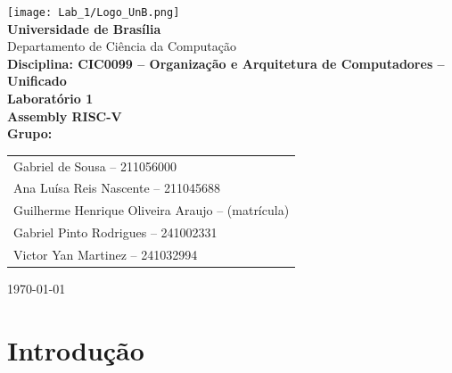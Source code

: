 \documentclass[12pt,a4paper]{article}
\begin{document}
\begin{titlepage}
    \begin{center}
        \vspace*{1cm}
        \texttt{[image: Lab\_1/Logo\_UnB.png]}\\[1cm]

        {\LARGE \textbf{Universidade de Brasília}}\\[4pt]
        {\large Departamento de Ciência da Computação}\\[12pt]
        {\Large \textbf{Disciplina: CIC0099 -- Organização e Arquitetura de Computadores -- Unificado}}\\[20pt]

        {\huge \textbf{Laboratório 1}}\\[6pt]
        {\Large \textbf{Assembly RISC-V}}\\[2cm]

        \textbf{Grupo:} \\[4pt]
        \begin{tabular}{l}
            
            Gabriel de Sousa -- 211056000 \\
            Ana Luísa Reis Nascente -- 211045688 \\
            Guilherme Henrique Oliveira Araujo -- (matrícula) \\
            Gabriel Pinto Rodrigues -- 241002331 \\
            Victor Yan Martinez -- 241032994 \\
            
        \end{tabular}

        \vfill

        

        \vspace{0.8cm}
        \today
    \end{center}
\end{titlepage}

\tableofcontents
\newpage


\section*{Introdução}
\end{document}
